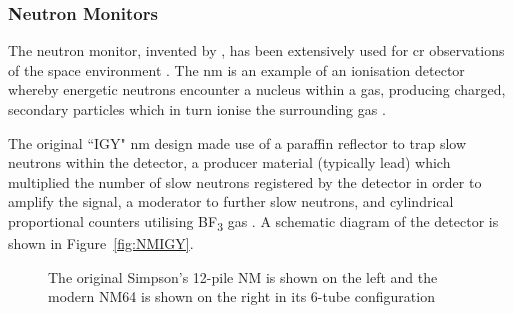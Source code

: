 \subsubsection*{Neutron Monitors}
The neutron monitor, invented by \cite{simpson_latitude_1948}, has been extensively used for \gls{cr} observations of the space environment \citep{clem_neutron_2000}. The \gls{nm} is an example of an ionisation detector whereby energetic neutrons encounter a nucleus within a gas, producing charged, secondary particles which in turn ionise the surrounding gas \citep{gloeckler_-situ_2010}.

The original ``IGY" \gls{nm} design made use of a paraffin reflector to trap slow neutrons within the detector, a producer material (typically lead) which multiplied the number of slow neutrons registered by the detector in order to amplify the signal, a moderator to further slow neutrons, and cylindrical proportional counters utilising BF\textsubscript{3} gas \citep{simpson_latitude_1948, simpson_cosmic_1953}. A schematic diagram of the detector is shown in Figure~\ref{fig:NMIGY}. %

\begin{figure}[ht!]
	\centering
	\qquad
	\caption{The original Simpson's 12-pile NM is shown on the left and the modern NM64 is shown on the right in its 6-tube configuration \citep{kang_characteristics_2012}}
	\label{fig:NM}
\end{figure}

